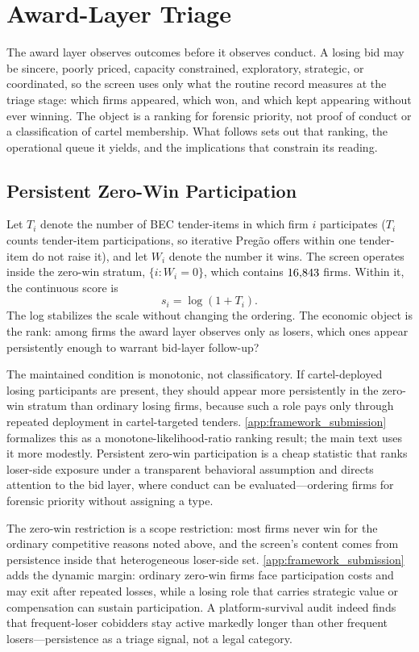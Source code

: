 \section{Award-Layer Triage}
\label{sec:award_screen}

%
The award layer observes outcomes before it observes conduct. A
losing bid may be sincere, poorly priced, capacity constrained,
exploratory, strategic, or coordinated, so the screen uses only what
the routine record measures at the triage stage: which firms appeared,
which won, and which kept appearing without ever winning. The object is
a ranking for forensic priority, not proof of conduct or a
classification of cartel membership. What follows sets out that
ranking, the operational queue it yields, and the implications that
constrain its reading.

\subsection{Persistent Zero-Win Participation}
\label{sec:award_primitive}

Let $T_i$ denote the number of BEC tender-items in which firm $i$
participates ($T_i$ counts tender-item participations, so iterative
Preg\~ao offers within one tender-item do not raise it), and let $W_i$
denote the number it wins. The screen operates inside the zero-win
stratum, $\{i:W_i=0\}$, which contains $16{,}843$ firms. Within
it, the continuous score is
\[
  s_i=\log(1+T_i).
\]
The log stabilizes the scale without changing the ordering. The
economic object is the rank: among firms the award layer observes only
as losers, which ones appear persistently enough to warrant bid-layer
follow-up?

The maintained condition is monotonic, not classificatory. If
cartel-deployed losing participants are present, they should appear
more persistently in the zero-win stratum than ordinary losing firms,
because such a role pays only through repeated deployment in
cartel-targeted tenders. \ref{app:framework_submission} formalizes this
as a monotone-likelihood-ratio ranking result; the main text uses it
more modestly. Persistent zero-win participation is a cheap statistic
that ranks loser-side exposure under a transparent behavioral
assumption and directs attention to the bid layer, where conduct can be
evaluated---ordering firms for forensic priority without assigning a
type.

The zero-win restriction is a scope restriction: most firms never win
for the ordinary competitive reasons noted above, and the screen's
content comes from persistence inside that heterogeneous loser-side
set. \ref{app:framework_submission} adds the dynamic margin: ordinary
zero-win firms face participation costs and may exit after repeated
losses, while a losing role that carries strategic value or
compensation can sustain participation. A platform-survival audit
indeed finds that frequent-loser cobidders stay active markedly longer
than other frequent losers---persistence as a triage signal, not a
legal category.


